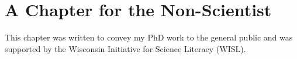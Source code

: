 
\glsresetall

\chapter{A Chapter for the Non-Scientist}
\label{ch:public}

\begin{quoting}
  This chapter was written to convey my PhD work to the general public and was
  supported by the Wisconsin Initiative for Science Literacy (WISL).
\end{quoting}

 


